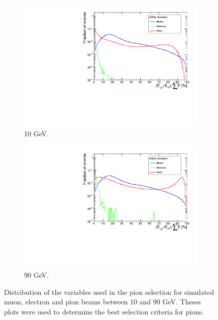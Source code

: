 \begin{figure}[htbp!]
\begin{subfigure}[t]{0.5\textwidth}
		\includegraphics[width=1\linewidth]{../Thesis_Plots/Timing/Pions/Plots/SelectionCut_EnergyLastLayers_10GeV}
		\caption{10 GeV.} \label{fig:pi10GeV_Elast}
	\end{subfigure}
	\hfill
	\begin{subfigure}[t]{0.5\textwidth}
		\centering
		\includegraphics[width=1\linewidth]{../Thesis_Plots/Timing/Pions/Plots/SelectionCut_EnergyLastLayers_90GeV}
		\caption{90 GeV.} \label{fig:pi90GeV_Elast}
	\end{subfigure}
	\caption{Distribution of the variables used in the pion selection for simulated muon, electron and pion beams between 10 and 90 GeV. Theses plots were used to determine the best selection criteria for pions.} \label{fig:pionselection}
\end{figure}

